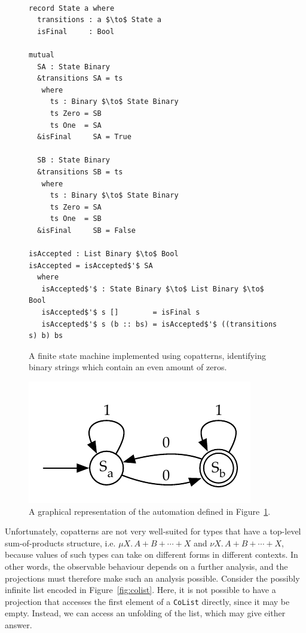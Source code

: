\begin{figure}[h]
\begin{lstlisting}[mathescape]

record State a where
  transitions : a $\to$ State a 
  isFinal     : Bool

mutual  
  SA : State Binary
  &transitions SA = ts
   where
     ts : Binary $\to$ State Binary
     ts Zero = SB
     ts One  = SA
  &isFinal     SA = True 
  
  SB : State Binary
  &transitions SB = ts
   where
     ts : Binary $\to$ State Binary
     ts Zero = SA 
     ts One  = SB
  &isFinal     SB = False

isAccepted : List Binary $\to$ Bool
isAccepted = isAccepted$'$ SA
  where
   isAccepted$'$ : State Binary $\to$ List Binary $\to$ Bool
   isAccepted$'$ s []        = isFinal s
   isAccepted$'$ s (b :: bs) = isAccepted$'$ ((transitions s) b) bs
\end{lstlisting}
  \caption{A finite state machine implemented using copatterns, identifying
    binary strings which contain an even amount of zeros.}
\label{fig:state_machine}
\end{figure}

\begin{figure}[h]
\centering
\includegraphics{figures/dfa}
\caption{A graphical representation of the automation defined in
  Figure~\ref{fig:state_machine}.}
\label{fig:state_machine_graphical}
\end{figure}

Unfortunately, copatterns are not very well-suited for types that have a top-level
sum-of-products structure, i.e. ${\mu X.\,A + B + \cdots + X}$ and
${\nu X.\,A + B + \cdots + X}$, because values of such types can take on
different forms in different contexts. In other words, the observable behaviour
depends on a further analysis, and the projections must therefore make
such an analysis possible. Consider the possibly infinite list encoded in
Figure~\ref{fig:colist}. Here, it is not possible to have a projection that
accesses the first element of a \texttt{CoList} directly, since it may be
empty. Instead, we can access an unfolding of the list, which may give either
answer.

